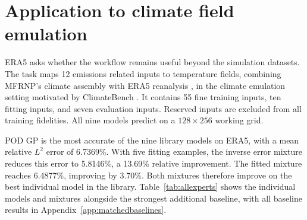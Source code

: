 \section{Application to climate field emulation}
\label{sec:climate}
ERA5 asks whether the workflow remains useful beyond the simulation datasets.
The task maps 12 emissions related inputs to temperature fields, combining
MFRNP's climate assembly \citep{niu2024} with ERA5 reanalysis
\citep{hersbach2020}, in the climate emulation setting motivated by ClimateBench
\citep{climatebench2022}. It contains 55 fine training inputs, ten fitting
inputs, and seven evaluation inputs. Reserved inputs are excluded from all
training fidelities. All nine models predict on a $128\times256$ working grid.


POD GP is the most accurate of the nine library models on ERA5, with a mean
relative $L^2$ error of 6.7369\%. With five fitting examples, the inverse error
mixture reduces this error to 5.8146\%, a 13.69\% relative improvement. The
fitted mixture reaches 6.4877\%, improving by 3.70\%. Both mixtures therefore
improve on the best individual model in the library. Table~\ref{tab:allexperts}
shows the individual models and mixtures alongside the strongest additional
baseline, with all baseline results in Appendix~\ref{app:matchedbaselines}.
